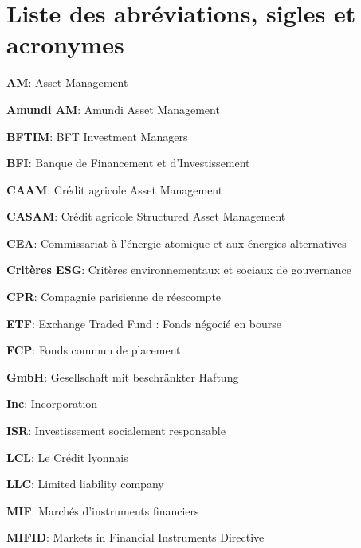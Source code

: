 \chapter*{Liste des abréviations, sigles et acronymes}
\par \textbf{AM}: Asset Management \\
\par \textbf{Amundi AM}: Amundi Asset Management \\
\par \textbf{BFTIM}: BFT Investment Managers \\
\par \textbf{BFI}: Banque de Financement et d'Investissement \\
\par \textbf{CAAM}: Crédit agricole Asset Management \\
\par \textbf{CASAM}: Crédit agricole Structured Asset Management \\
\par \textbf{CEA}: Commissariat à l'énergie atomique et aux énergies alternatives\\
\par \textbf{Critères ESG}: Critères environnementaux et sociaux de gouvernance\\
\par \textbf{CPR}: Compagnie parisienne de réescompte \\
\par \textbf{ETF}: Exchange Traded Fund : Fonds négocié en bourse\\
\par \textbf{FCP}: Fonds commun de placement \\
\par \textbf{GmbH}: Gesellschaft mit beschränkter Haftung \\
\par \textbf{Inc}: Incorporation \\
\par \textbf{ISR}: Investissement socialement responsable \\
\par \textbf{LCL}: Le Crédit lyonnais \\
\par \textbf{LLC}: Limited liability company \\
\par \textbf{MIF}: Marchés d'instruments financiers \\
\par \textbf{MIFID}: Markets in Financial Instruments Directive \\
